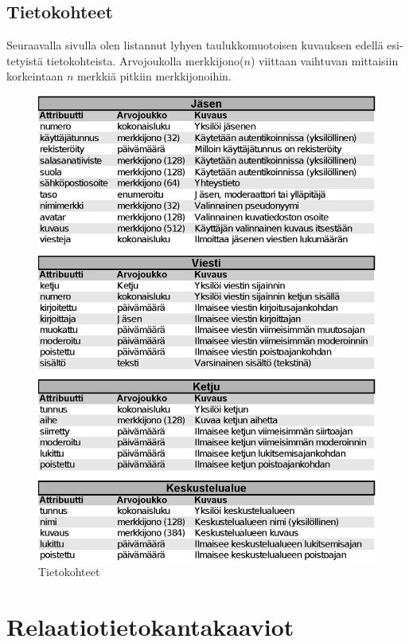 \documentclass[11pt]{article}
\begin{document}
	\subsection{Tietokohteet} Seuraavalla sivulla olen listannut lyhyen taulukkomuotoisen kuvauksen edellä
		esi-tetyistä tietokohteista. Arvojoukolla merkkijono($n$) viittaan vaihtuvan mittaisiin korkeintaan
		$n$ merkkiä pitkiin merkkijonoihin.
	
		\newpage
		\thispagestyle{plain}
		
		\begin{figure}[H]
			\includegraphics{tietokohteet.eps}
			\caption{Tietokohteet}
		\end{figure}
		
\newpage
\thispagestyle{plain}		
	\section{Relaatiotietokantakaaviot}
\end{document}
